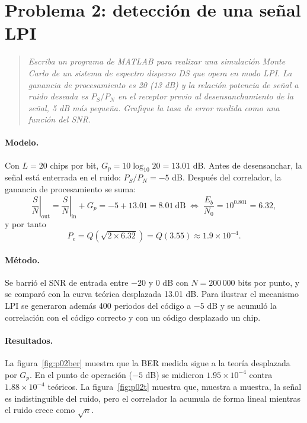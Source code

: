 \documentclass[11pt,a4paper]{article}
\begin{document}
\section{Problema 2: detección de una señal LPI}

\begin{quote}
\itshape
Escriba un programa de MATLAB para realizar una simulación Monte Carlo de un
sistema de espectro disperso DS que opera en modo LPI. La ganancia de
procesamiento es 20 (13 dB) y la relación potencia de señal a ruido deseada es
$P_S/P_N$ en el receptor previo al desensanchamiento de la señal, 5 dB más
pequeña. Grafique la tasa de error medida como una función del SNR.
\end{quote}

\paragraph{Modelo.} Con $L=20$ chips por bit, $G_p=10\log_{10}20=13.01$ dB.
Antes de desensanchar, la señal está enterrada en el ruido:
$P_S/P_N=-5$ dB. Después del correlador, la ganancia de procesamiento se suma:
\begin{equation}
  \left.\frac{S}{N}\right|_\text{out}
  =\left.\frac{S}{N}\right|_\text{in}+G_p=-5+13.01=8.01\ \text{dB}
  \;\Longleftrightarrow\;
  \frac{E_b}{N_0}=10^{0.801}=6.32,
\end{equation}
y por tanto
\begin{equation}
  P_e=Q\!\left(\sqrt{2\times6.32}\right)=Q(3.55)\approx1.9\times10^{-4}.
\end{equation}

\paragraph{Método.} Se barrió el SNR de entrada entre $-20$ y $0$ dB con
$N=200\,000$ bits por punto, y se comparó con la curva teórica desplazada
13.01 dB. Para ilustrar el mecanismo LPI se generaron además 400 periodos del
código a $-5$ dB y se acumuló la correlación con el código correcto y con un
código desplazado un chip.

\paragraph{Resultados.} La figura~\ref{fig:p02ber} muestra que la BER medida
sigue a la teoría desplazada por $G_p$. En el punto de operación ($-5$ dB) se
midieron $1.95\times10^{-4}$ contra $1.88\times10^{-4}$ teóricos. La
figura~\ref{fig:p02t} muestra que, muestra a muestra, la señal es
indistinguible del ruido, pero el correlador la acumula de forma lineal mientras
el ruido crece como $\sqrt{n}$.
\end{document}
